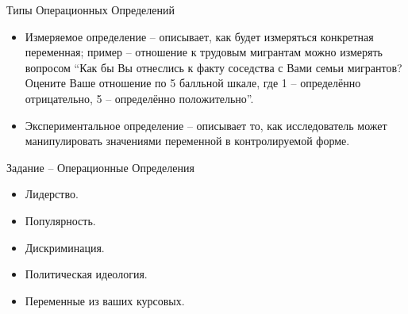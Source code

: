 \documentclass{beamer}
\begin{document}
\begin{frame}{Типы Операционных Определений}
\begin{itemize}
	\setlength\itemsep{2em}
	\item Измеряемое определение -- описывает,  как будет измеряться конкретная переменная; пример -- отношение к трудовым мигрантам можно измерять вопросом  ``Как бы Вы отнеслись к факту соседства с Вами семьи мигрантов? Оцените Ваше отношение по 5 балльной шкале, где 1 -- определённо отрицательно,  5 -- определённо положительно''.  
	\item Экспериментальное определение -- описывает то,  как исследователь может манипулировать значениями переменной в контролируемой форме.  
\end{itemize}
\end{frame}
\begin{frame}{Задание -- Операционные Определения}
\begin{itemize}
	\setlength\itemsep{2em}
	\item Лидерство.
	\item Популярность.
	\item Дискриминация. 
	\item Политическая идеология. 
	\item Переменные из ваших курсовых. 
\end{itemize}
\end{frame}
\end{document}

